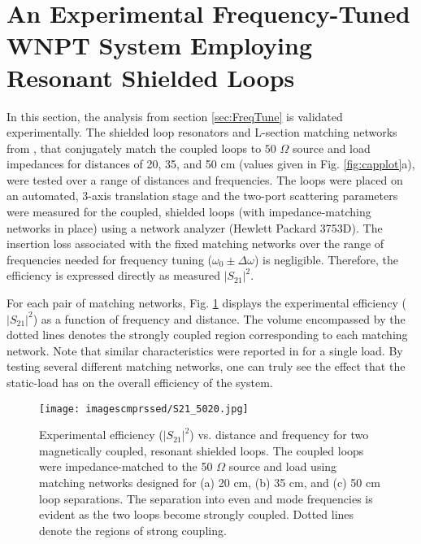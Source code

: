 \documentclass[journal]{IEEEtran}
\begin{document}
\section{An Experimental Frequency-Tuned WNPT System Employing Resonant Shielded Loops}

In this section, the analysis from section \ref{sec:FreqTune} is validated experimentally. The shielded loop resonators and L-section matching networks from \cite{Thomas}, that conjugately match the coupled loops to $50$ $\Omega$ source and load impedances for distances of 20, 35, and 50 cm (values given in Fig. \ref{fig:capplot}a), were tested over a range of distances and frequencies. The loops were placed on an automated, 3-axis translation stage and the two-port scattering parameters were measured for the coupled, shielded loops (with impedance-matching networks in place) using a network analyzer (Hewlett Packard 3753D). The insertion loss associated with the fixed matching networks over the range of frequencies needed for frequency tuning ($\omega_0\pm\Delta\omega$) is negligible. Therefore, the efficiency is expressed directly as measured $|S_{21}|^2$.

For each pair of matching networks, Fig. \ref{fig:S21} displays the experimental efficiency ($|S_{21}|^2$) as a function of frequency and distance. The volume encompassed by the dotted lines denotes the strongly coupled region corresponding to each matching network. Note that similar characteristics were reported in \cite{Intel} for a single load. By testing several different matching networks, one can truly see the effect that the static-load has on the overall efficiency of the system.
\begin{figure}[htbp]
    \centering
    \texttt{[image: imagescmprssed/S21\_5020.jpg]}
    \caption{Experimental efficiency (${\left|S_{21}\right|}^2$) vs. distance and frequency for two magnetically coupled, resonant shielded loops. The coupled loops were impedance-matched to the 50 $\Omega$ source and load using matching networks designed for (a) 20 cm, (b) 35 cm, and (c) 50 cm loop separations. The separation into even and mode frequencies is evident as the two loops become strongly coupled. Dotted lines denote the regions of strong coupling.}
    \label{fig:S21}
\end{figure}
\end{document}
